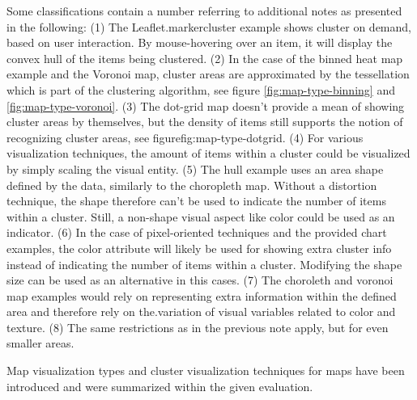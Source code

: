 Some classifications contain a number referring to additional notes as presented in the following: (1) The Leaflet.markercluster example shows cluster on demand, based on user interaction. By mouse-hovering over an item, it will display the convex hull of the items being clustered. (2) In the case of the binned heat map example and the Voronoi map, cluster areas are approximated by the tessellation which is part of the clustering algorithm, see figure \ref{fig:map-type-binning} and \ref{fig:map-type-voronoi}. (3) The dot-grid map doesn't provide a mean of showing cluster areas by themselves, but the density of items still supports the notion of recognizing cluster areas, see figure{fig:map-type-dotgrid}. (4) For various visualization techniques, the amount of items within a cluster could be visualized by simply scaling the visual entity. (5) The hull example uses an area shape defined by the data, similarly to the choropleth map. Without a distortion technique, the shape therefore can't be used to indicate the number of items within a cluster. Still, a non-shape visual aspect like color could be used as an indicator. (6) In the case of pixel-oriented techniques and the provided chart examples, the color attribute will likely be used for showing extra cluster info instead of indicating the number of items within a cluster. Modifying the shape size can be used as an alternative in this cases. (7) The choroleth and voronoi map examples would rely on representing extra information within the defined area and therefore rely on the.variation of visual variables related to color and texture. (8) The same restrictions as in the previous note apply, but for even smaller areas.

Map visualization types and cluster visualization techniques for maps have been introduced and were summarized within the given evaluation.


